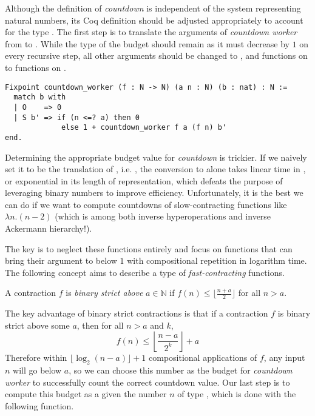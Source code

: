 Although the definition of \emph{countdown} is independent of the system representing natural numbers, its Coq definition should be adjusted appropriately to account for the type . The first step is to translate the arguments of \emph{countdown worker} from  to . While the type of the budget  should remain  as it must decrease by $1$ on every recursive step, all other  arguments should be changed to , and functions on  to functions on .
\begin{lstlisting}
Fixpoint countdown_worker (f : N -> N) (a n : N) (b : nat) : N :=
  match b with
  | O    => 0
  | S b' => if (n <=? a) then 0
             else 1 + countdown_worker f a (f n) b'
end.
\end{lstlisting}
Determining the appropriate budget value for \emph{countdown} is trickier. If we naively set it to be the  translation of , i.e. , the conversion to  alone takes linear time in , or exponential in its length of representation, which defeats the purpose of leveraging binary numbers to improve efficiency. Unfortunately, it is the best we can do if we want to compute countdowns of slow-contracting functions like $\lambda n.(n - 2)$ (which is among both inverse hyperoperations and inverse Ackermann hierarchy!).

The key is to neglect these functions entirely and focus on functions that can bring their argument to below $1$ with compositional repetition in logarithm time. The following concept aims to describe a type of \emph{fast-contracting} functions.
\begin{defn} \label{defn: bin-contraction}
	A contraction $f$ is \emph{binary strict above} $a\in \mathbb{N}$ if $f(n) \le \lfloor \frac{n + a}{2} \rfloor$ for all $n > a$.
\end{defn}
The key advantage of binary strict contractions is that if a contraction $f$ is binary strict above some $a$, then for all $n > a$ and $k$,
\begin{equation*}
f(n) \le \left\lfloor \frac{n - a}{2^k} \right\rfloor + a
\end{equation*}
Therefore within $\lfloor \log_2 (n - a) \rfloor + 1$ compositional applications of $f$, any input $n$ will go below $a$, so we can choose this number as the budget for \emph{countdown worker} to successfully count the correct countdown value. Our last step is to compute this budget as a  given the number $n$ of type , which is done with the following function.

